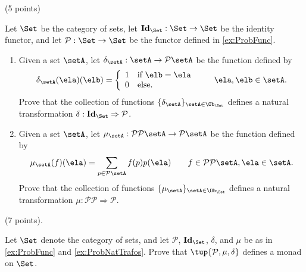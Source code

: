 \documentclass[paper=8.125in:10.250in,pagesize=pdftex,
    headinclude=false,footinclude=false,oneside,egregdoesnotlikesansseriftitles]{kaobook}
\begin{document}
\begin{gradedexercise}\label{ex:ProbNatTrafos} (5 points)


Let $\Set$ be the category of sets, let $\mathbf{Id}_\Set : \Set \to \Set$ be the identity functor, and let $\mathcal{P}: \Set \to \Set$ be the functor defined in \cref{ex:ProbFunc}. 
\begin{enumerate}
\item Given a set $\setA$, let $\delta_{\setA} : \setA \to \mathcal{P} \setA$ be the function defined by
$$\delta_\setA (\ela)(\elb) = \left\{\begin{array}{ll}
        1 & \text{if } \elb = \ela \\
        0 & \text{else.} 
        \end{array}\right. 
  \quad \quad \ela, \elb \in \setA.$$
Prove that the collection of functions $\{ \delta_{\setA} \}_{\setA \in \Ob_{\Set}}$ defines a natural transformation $\delta: \mathbf{Id}_\Set \Rightarrow \mathcal{P}$. 
\item Given a set $\setA$, let $\mu_\setA : \mathcal{P} \mathcal{P} \setA \to \mathcal{P} \setA$ be the function defined by 
$$\mu_\setA (f)(\ela) = \sum_{p \in \mathcal{P} \setA} f(p) p(\ela) \quad \quad f \in \mathcal{P} \mathcal{P} \setA, \ela \in \setA.$$
Prove that the collection of functions $\{ \mu_{\setA} \}_{\setA \in \Ob_{\Set}}$ defines a natural transformation $\mu: \mathcal{P} \mathcal{P} \Rightarrow \mathcal{P}$. 
\end{enumerate}
\end{gradedexercise}


\newpage


\begin{gradedexercise}\label{ex:ProbMonad} (7 points).


Let $\Set$ denote the category of sets, and let $\mathcal{P}$, $\mathbf{Id}_\Set$, $\delta$, and $\mu$ be as in \cref{ex:ProbFunc} and \cref{ex:ProbNatTrafos}. 
Prove that $\tup{\mathcal{P}, \mu, \delta}$ defines a monad on $\Set$. 
\end{gradedexercise}


\newpage
\end{document}
